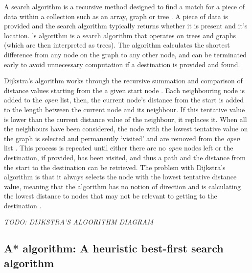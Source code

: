 \documentclass[11pt, a4paper]{report}
\begin{document}
A search algorithm is a recursive method designed to find a match for a piece of data within a collection such as an array, graph or tree \parencite{friedman1976algorithm}. A piece of data is provided and the search algorithm typically returns whether it is present and it's location. \citeauthor{dijkstra1959note}'s algorithm \parencite*{dijkstra1959note} is a search algorithm that operates on trees and graphs (which are then interpreted as trees). The algorithm calculates the shortest difference from any node on the graph to any other node, and can be terminated early to avoid unnecessary computation if a destination is provided and found.

Dijkstra's algorithm works through the recursive summation and comparison of distance values starting from the a given start node \parencite[269]{dijkstra1959note}. Each neighbouring node is added to the \emph{open} list, then, the current node's distance from the start is added to the length between the current node and its neighbour. If this tentative value is lower than the current distance value of the neighbour, it replaces it. When all the neighbours have been considered, the node with the lowest tentative value on the graph is selected and permanently `visited' and are removed from the \emph{open} list \parencite{dijkstra1959note}. This process is repeated until either there are no \emph{open} nodes left or the destination, if provided, has been visited, and thus a path and the distance from the start to the destination can be retrieved. The problem with Dijkstra's algorithm is that it always selects the node with the lowest tentative distance value, meaning that the algorithm has no notion of direction and is calculating the lowest distance to nodes that may not be relevant to getting to the destination \parencite[214]{millington2019ai}.

\emph{TODO: DIJKSTRA'S ALGORITHM DIAGRAM}

\subsection{A* algorithm: A heuristic best-first search algorithm}
\label{subsec:aStarAlgorithm}
\end{document}
